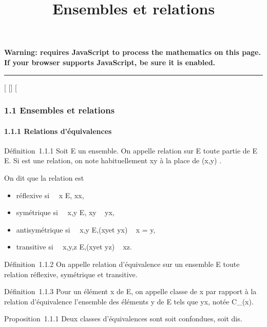\documentclass[]{article}
\title{Ensembles et relations}
\author{}
\date{}
\begin{document}
\maketitle

\textbf{Warning: 
requires JavaScript to process the mathematics on this page.\\ If your
browser supports JavaScript, be sure it is enabled.}

\begin{center}\rule{3in}{0.4pt}\end{center}

{[}
{[}{]}
{[}

\subsubsection{1.1 Ensembles et relations}

\paragraph{1.1.1 Relations d'équivalences}

Définition~1.1.1 Soit E un ensemble. On appelle relation sur E toute
partie de E \times E. Si  est une relation, on note habituellement xy à la
place de (x,y) \in{}.

On dit que la relation est

\begin{itemize}
\itemsep1pt\parskip0pt
\item
  réflexive si \forall~~x \in E, xx,
\item
  symétrique si \forall~~x,y \in E,\quad
  xy \rigtharrow~ yx,
\item
  antisymétrique si \forall~~x,y \in
  E,\quad (xy\text et yx) \rigtharrow~ x = y,
\item
  transitive si \forall~~x,y,z \in
  E,\quad (xy\text et yz) \rigtharrow~ xz.
\end{itemize}

Définition~1.1.2 On appelle relation d'équivalence sur un ensemble E
toute relation réflexive, symétrique et transitive.

Définition~1.1.3 Pour un élément x de E, on appelle classe de x par
rapport à la relation d'équivalence  l'ensemble des éléments y de E
tels que yx, notée C\_(x).

Proposition~1.1.1 Deux classes d'équivalences sont soit confondues, soit
dis\jmathointes.
\end{document}
